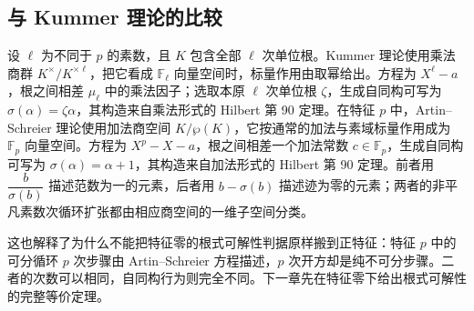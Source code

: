\subsection{与 Kummer 理论的比较}
\label{b1:subsec:2004:03}

设 \(\ell\) 为不同于 \(p\) 的素数，且 \(K\) 包含全部 \(\ell\) 次单位根。Kummer 理论使用乘法商群 \(K^\times/K^{\times\ell}\)，把它看成 \(\mathbb F_\ell\) 向量空间时，标量作用由取幂给出。方程为 \(X^\ell-a\)，根之间相差 \(\mu_\ell\) 中的乘法因子；选取本原 \(\ell\) 次单位根 \(\zeta\)，生成自同构可写为 \(\sigma(\alpha)=\zeta\alpha\)，其构造来自乘法形式的 Hilbert 第 90 定理。在特征 \(p\) 中，Artin--Schreier 理论使用加法商空间 \(K/\wp(K)\)，它按通常的加法与素域标量作用成为 \(\mathbb F_p\) 向量空间。方程为 \(X^p-X-a\)，根之间相差一个加法常数 \(c\in\mathbb F_p\)，生成自同构可写为 \(\sigma(\alpha)=\alpha+1\)，其构造来自加法形式的 Hilbert 第 90 定理。前者用 \(\dfrac{b}{\sigma(b)}\) 描述范数为一的元素，后者用 \(b-\sigma(b)\) 描述迹为零的元素；两者的非平凡素数次循环扩张都由相应商空间的一维子空间分类。

\ProseParagraphBreak
这也解释了为什么不能把特征零的根式可解性判据原样搬到正特征：特征 \(p\) 中的可分循环 \(p\) 次步骤由 Artin--Schreier 方程描述，\(p\) 次开方却是纯不可分步骤。二者的次数可以相同，自同构行为则完全不同。下一章先在特征零下给出根式可解性的完整等价定理。
